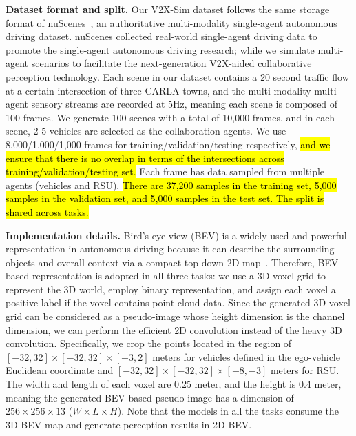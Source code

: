 \textbf{Dataset format and split.} Our V2X-Sim dataset follows the same storage format of nuScenes~\cite{Caesar2020nuScenesAM}, an authoritative multi-modality single-agent autonomous driving dataset. nuScenes collected real-world single-agent driving data to promote the single-agent autonomous driving research; while we simulate multi-agent scenarios to facilitate the next-generation V2X-aided collaborative perception technology. Each scene in our dataset contains a 20 second traffic flow at a certain intersection of three CARLA towns, and the multi-modality multi-agent sensory streams are recorded at 5Hz, meaning each scene is composed of 100 frames. We generate 100 scenes with a total of 10,000 frames, and in each scene, 2-5 vehicles are selected as the collaboration agents. We use 8,000/1,000/1,000 frames for training/validation/testing respectively, \hl{and we ensure that there is no overlap in terms of the intersections across training/validation/testing set.} Each frame has data sampled from multiple agents (vehicles and RSU). \hl{There are 37,200 samples in the training set, 5,000 samples in the validation set, and 5,000 samples in the test set. The split is shared across tasks.}

\textbf{Implementation details.} Bird's-eye-view (BEV) is a widely used and powerful representation in autonomous driving because it can describe the surrounding objects and overall context via a compact top-down 2D map~\cite{Wu2020MotionNetJP}. Therefore, BEV-based representation is adopted in all three tasks: we use a 3D voxel grid to represent the 3D world, employ binary representation, and assign each voxel a positive label if the voxel contains point cloud data. Since the generated 3D voxel grid can be considered as a pseudo-image whose height dimension is the channel dimension, we can perform the efficient 2D convolution instead of the heavy 3D convolution. Specifically, we crop the points located in the region of $[-32, 32] \times [-32, 32] \times[-3, 2]$ meters for vehicles defined in the ego-vehicle Euclidean coordinate and $[-32, 32] \times [-32, 32] \times[-8, -3]$ meters for RSU. The width and length of each voxel are 0.25 meter, and the height is 0.4 meter, meaning the generated BEV-based pseudo-image has a dimension of $256\times256\times13$ ($W\times L\times H$). Note that the models in all the tasks consume the 3D BEV map and generate perception results in 2D BEV. 

